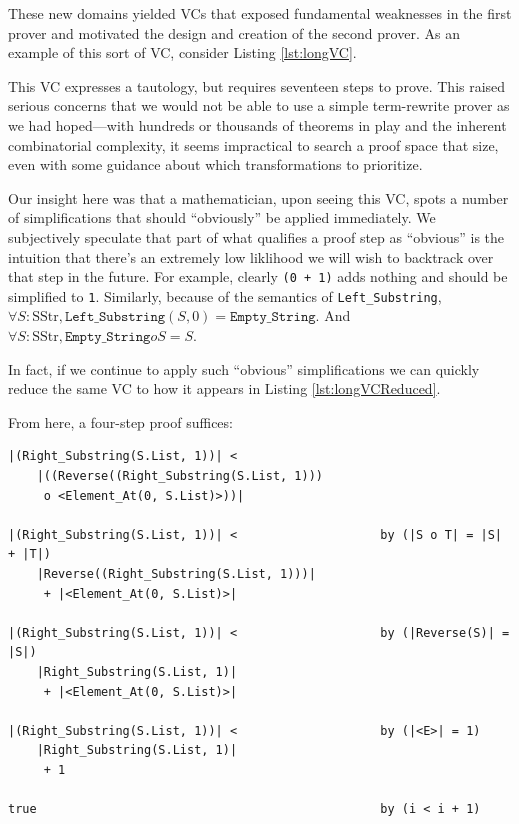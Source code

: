 These new domains yielded VCs that exposed fundamental weaknesses in the first prover and motivated the design and creation of the second prover.  As an example of this sort of VC, consider Listing \ref{lst:longVC}.



This VC expresses a tautology, but requires seventeen steps to prove.  This raised serious concerns that we would not be able to use a simple term-rewrite prover as we had hoped---with hundreds or thousands of theorems in play and the inherent combinatorial complexity, it seems impractical to search a proof space that size, even with some guidance about which transformations to prioritize.

Our insight here was that a mathematician, upon seeing this VC, spots a number of simplifications that should ``obviously'' be applied immediately.  We subjectively speculate that part of what qualifies a proof step as ``obvious'' is the intuition that there's an extremely low liklihood we will wish to backtrack over that step in the future.  For example, clearly \texttt{(0 + 1)} adds nothing and should be simplified to \texttt{1}.  Similarly, because of the semantics of \texttt{Left\_Substring}, $\forall S : \text{SStr}, \texttt{Left\_Substring}(S, 0) = \texttt{Empty\_String}$.  And $\forall S : \text{SStr}, \texttt{Empty\_String} o S = S$.

In fact, if we continue to apply such ``obvious'' simplifications we can quickly reduce the same VC to how it appears in Listing \ref{lst:longVCReduced}.



From here, a four-step proof suffices:

\begin{lstlisting}
|(Right_Substring(S.List, 1))| < 
	|((Reverse((Right_Substring(S.List, 1)))
	 o <Element_At(0, S.List)>))|

|(Right_Substring(S.List, 1))| <                    by (|S o T| = |S| + |T|)
	|Reverse((Right_Substring(S.List, 1)))|
	 + |<Element_At(0, S.List)>|

|(Right_Substring(S.List, 1))| <                    by (|Reverse(S)| = |S|)
	|Right_Substring(S.List, 1)|
	 + |<Element_At(0, S.List)>|

|(Right_Substring(S.List, 1))| <                    by (|<E>| = 1)
	|Right_Substring(S.List, 1)|
	 + 1

true                                                by (i < i + 1)
\end{lstlisting}

